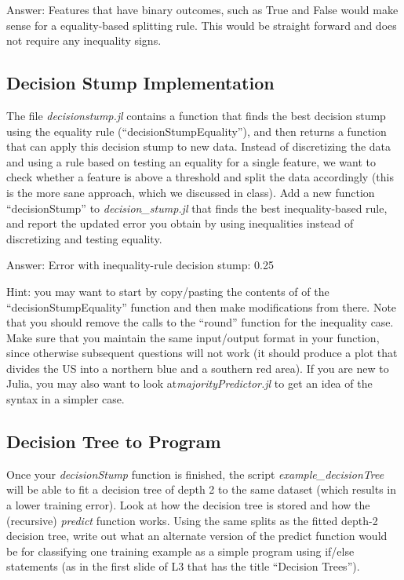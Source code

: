 \documentclass{article}
\def\ans#1{\par\gre{Answer: #1}}
\def\blu#1{{\color{blu}#1}}
\def\gre#1{{\color{gre}#1}}
\begin{document}
\ans{Features that have binary outcomes, such as True and False would make sense for a equality-based splitting rule. This would be straight forward and does not require any inequality signs.}

\pagebreak


\subsection{Decision Stump Implementation}

The file \emph{decisionstump.jl} contains a function  that finds the best decision stump using the equality rule (``decisionStumpEquality''), and then returns a function that can apply this decision stump to new data. Instead of discretizing the data and using a rule based on testing an equality for a single feature, we want to check whether a feature is above a threshold and split the data accordingly (this is the more sane approach, which we discussed in class). \blu{Add a new function ``decisionStump'' to \emph{decision\_stump.jl} that finds the best inequality-based rule, and report the updated error you obtain by using inequalities instead of discretizing and testing equality.}

\ans{Error with inequality-rule decision stump: 0.25}

Hint: you may want to start by copy/pasting the contents of of the ``decisionStumpEquality'' function and then make modifications from there. Note that you should remove the calls to the ``round'' function for the inequality case.  Make sure that you maintain the same input/output format in your function, since otherwise subsequent questions will not work (it should produce a plot that divides the US into a northern blue and a southern red area).
If you are new to Julia, you may also want to look at\emph{majorityPredictor.jl} to get an idea of the syntax in  a simpler case.
\pagebreak

\subsection{Decision Tree to Program}

Once your \emph{decisionStump} function is finished, the script \emph{example\_decisionTree} will be able to fit a decision tree of depth 2 to the same dataset (which results in a lower training error). Look at how the decision tree is stored and how the (recursive) \emph{predict} function works. \blu{Using the same splits as the fitted depth-2 decision tree, write out what an alternate version of the predict function would be for classifying one training example as a simple program using if/else statements (as in the first slide of L3 that has the title ``Decision Trees'').}
\end{document}
